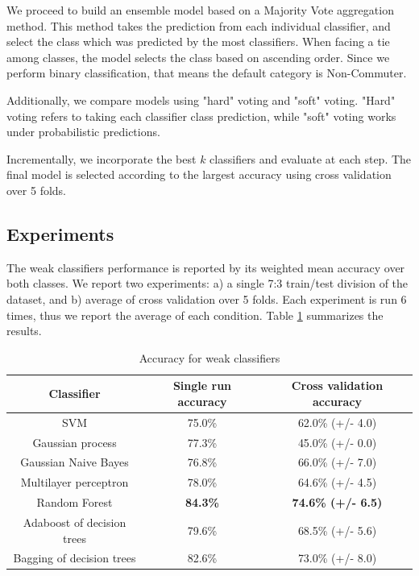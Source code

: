 \documentclass{article}
\begin{document}
We proceed to build an ensemble model based on a Majority Vote aggregation method. This method takes the prediction from each individual classifier, and select the class which was predicted by the most classifiers. When facing a tie among classes, the model selects the class based on ascending order. Since we perform binary classification, that means the default category is Non-Commuter. 

Additionally, we compare models using "hard" voting and "soft" voting. "Hard" voting refers to taking each classifier class prediction, while "soft" voting works under probabilistic predictions. 

Incrementally, we incorporate the best $k$ classifiers and evaluate at each step. The final model is selected according to the largest accuracy using cross validation over 5 folds. 

\subsection{Experiments} 
The weak classifiers performance is reported by its weighted mean accuracy over both classes. We report two experiments: a) a single 7:3 train/test division of the dataset, and b) average of cross validation over 5 folds. Each experiment is run 6 times, thus we report the average of each condition. Table \ref{table:weakClassifiers} summarizes the results. 



\begin{table}[H]
\centering
\begin{tabular}{||c|c|c||}
\hline
\textbf{Classifier} & \textbf{Single run accuracy} & \textbf{Cross validation accuracy} \\ [0.5ex] 
\hline \hline
SVM & 75.0\% & 62.0\% (+/- 4.0)\\
Gaussian process & 77.3\% & 45.0\% (+/- 0.0)\\
Gaussian Naive Bayes & 76.8\% & 66.0\% (+/- 7.0)\\
Multilayer perceptron & 78.0\% & 64.6\% (+/- 4.5)\\
Random Forest & \textbf{84.3\%} & \textbf{74.6\% (+/- 6.5)}\\
Adaboost of decision trees & 79.6\% & 68.5\% (+/- 5.6)\\
Bagging of decision trees & 82.6\% & 73.0\% (+/- 8.0)\\
\hline 
\end{tabular}
\caption{Accuracy for weak classifiers}
\label{table:weakClassifiers}
\end{table}
\end{document}
